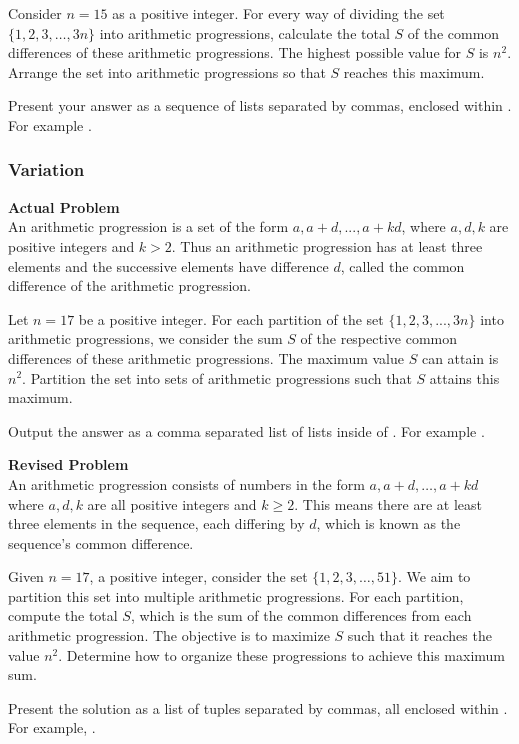 Consider $n = 15$ as a positive integer. For every way of dividing the set $\{1, 2, 3, \ldots, 3n\}$ into arithmetic progressions, calculate the total $S$ of the common differences of these arithmetic progressions. The highest possible value for $S$ is $n^2$. Arrange the set into arithmetic progressions so that $S$ reaches this maximum.

Present your answer as a sequence of lists separated by commas, enclosed within . For example .

\subsubsection{Variation}
\textbf{Actual Problem}\\
An arithmetic progression is a set of the form ${a, a+d, . . . , a+kd}$, where $a, d, k$ are positive integers and $k > 2$. Thus an arithmetic progression has at least three elements and the successive elements have difference $d$, called the common difference of the arithmetic progression.

Let $n = 17$ be a positive integer. For each partition of the set $\{1, 2, 3, ..., 3n\}$ into arithmetic progressions, we consider the sum $S$ of the respective common differences of these arithmetic progressions. The maximum value $S$ can attain is $n^2$. Partition the set into sets of arithmetic progressions such that $S$ attains this maximum.

Output the answer as a comma separated list of lists inside of . For example .

\textbf{Revised Problem}\\
An arithmetic progression consists of numbers in the form \( a, a+d, \ldots, a+kd \) where \( a, d, k \) are all positive integers and \( k \geq 2 \). This means there are at least three elements in the sequence, each differing by \( d \), which is known as the sequence's common difference.

Given \( n = 17 \), a positive integer, consider the set \(\{1, 2, 3, \ldots, 51\}\). We aim to partition this set into multiple arithmetic progressions. For each partition, compute the total \( S \), which is the sum of the common differences from each arithmetic progression. The objective is to maximize \( S \) such that it reaches the value \( n^2 \). Determine how to organize these progressions to achieve this maximum sum.

Present the solution as a list of tuples separated by commas, all enclosed within . For example, .

